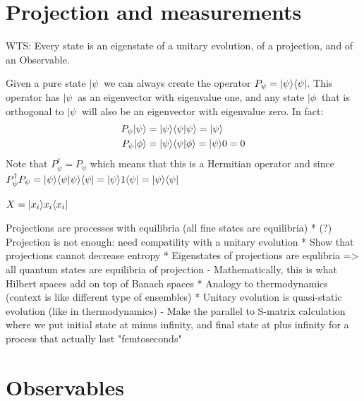 \section{Projection and measurements}


WTS: Every state is an eigenstate of a unitary evolution, of a projection, and of an Observable.

Given a pure state $|\psi \>$ we can always create the operator $P_{\psi}=|\psi \rangle \langle\psi|$. This operator has $|\psi\>$ as an eigenvector with eigenvalue one, and any state $|\phi\>$ that is orthogonal to $|\psi\>$ will also be an eigenvector with eigenvalue zero. In fact:
\begin{equation}
	\begin{aligned}
		P_{\psi} | \psi \rangle &= |\psi \rangle \langle\psi|\psi\rangle = |\psi \rangle \\
		P_{\psi} | \phi \rangle &= |\psi \rangle \langle\psi|\phi\rangle = |\psi \rangle 0 = 0 \\
	\end{aligned}
\end{equation}
Note that $P_{\psi}^\dagger = P_{\psi}$ which means that this is a Hermitian operator and since  $P_{\psi}^\dagger P_{\psi}  = |\psi \rangle \langle\psi|\psi\rangle \langle\psi| = |\psi \rangle 1 \langle\psi| = |\psi \rangle \langle\psi|$

$X = |x_i\rangle x_i \langle x_i|$


Projections are processes with equilibria (all fine states are equilibria)
* (?) Projection is not enough: need compatility with a unitary evolution
* Show that projections cannot decrease entropy
* Eigenstates of projections are equlibria => all quantum states are equilibria of projection
  - Mathematically, this is what Hilbert spaces add on top of Banach spaces
* Analogy to thermodynamics (context is like different type of ensembles)
* Unitary evolution is quasi-static evolution (like in thermodynamics)
  - Make the parallel to S-matrix calculation where we put initial state at minus infinity, and final state at plus infinity for a process that actually last "femtoseconds"
  


\section{Observables}
